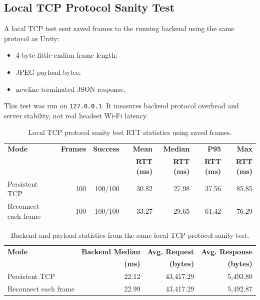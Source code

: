 \documentclass[11pt]{article}
\begin{document}
\subsection{Local TCP Protocol Sanity Test}

A local TCP test sent saved frames to the running backend using the same protocol as Unity:

\begin{itemize}
    \item 4-byte little-endian frame length;
    \item JPEG payload bytes;
    \item newline-terminated JSON response.
\end{itemize}

This test was run on \texttt{127.0.0.1}. It measures backend protocol overhead and server stability, not real headset Wi-Fi latency.

\begin{table}[H]
\centering
\begin{tabular}{lrrrrrr}
\toprule
\textbf{Mode} & \textbf{Frames} & \textbf{Success} & \textbf{Mean} & \textbf{Median} & \textbf{P95} & \textbf{Max} \\
 & & & \textbf{RTT (ms)} & \textbf{RTT (ms)} & \textbf{RTT (ms)} & \textbf{RTT (ms)} \\
\midrule
Persistent TCP & 100 & 100/100 & 30.82 & 27.98 & 37.56 & 85.85 \\
Reconnect each frame & 100 & 100/100 & 33.27 & 29.65 & 61.42 & 76.29 \\
\bottomrule
\end{tabular}
\caption{Local TCP protocol sanity test RTT statistics using saved frames.}
\end{table}

\begin{table}[H]
\centering
\begin{tabular}{lrrr}
\toprule
\textbf{Mode} & \textbf{Backend Median} & \textbf{Avg. Request} & \textbf{Avg. Response} \\
 & \textbf{(ms)} & \textbf{(bytes)} & \textbf{(bytes)} \\
\midrule
Persistent TCP & 22.12 & 43,417.29 & 5,493.80 \\
Reconnect each frame & 22.99 & 43,417.29 & 5,492.87 \\
\bottomrule
\end{tabular}
\caption{Backend and payload statistics from the same local TCP protocol sanity test.}
\end{table}
\end{document}
